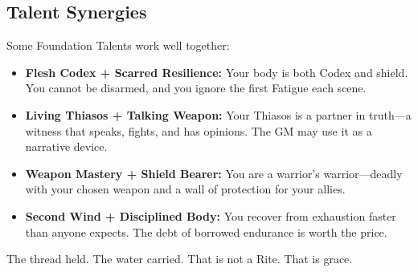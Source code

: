 \subsection{Talent Synergies}

Some Foundation Talents work well together:

\begin{itemize}
\item \textbf{Flesh Codex + Scarred Resilience:} Your body is both Codex and shield. You cannot be disarmed, and you ignore the first Fatigue each scene.
\item \textbf{Living Thiasos + Talking Weapon:} Your Thiasos is a partner in truth—a witness that speaks, fights, and has opinions. The GM may use it as a narrative device.
\item \textbf{Weapon Mastery + Shield Bearer:} You are a warrior's warrior—deadly with your chosen weapon and a wall of protection for your allies.
\item \textbf{Second Wind + Disciplined Body:} You recover from exhaustion faster than anyone expects. The debt of borrowed endurance is worth the price.
\end{itemize}

The thread held. The water carried. That is not a Rite. That is grace.
